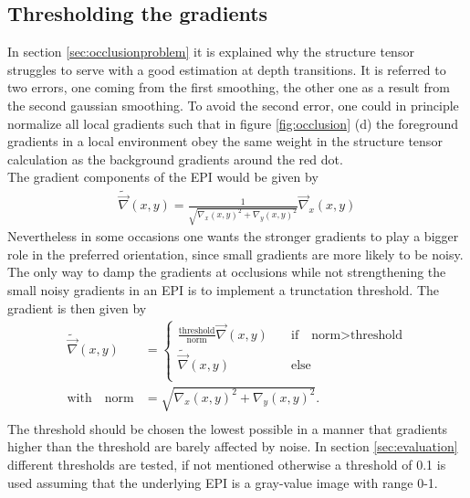 \documentclass  [
  paper    = a4,
  BCOR     = 10mm,
  twoside,
  fontsize = 12pt,
  fleqn,
  toc      = bibnumbered,
  toc      = listofnumbered,
  numbers  = noendperiod,
  headings = normal,
  listof   = leveldown,
  version  = 3.03
]                                       {scrreprt}
\begin{document}
 \subsection{Thresholding the gradients}
 \label{sec:thresholdinggradients}
 In section \ref{sec:occlusionproblem} it is explained why the structure tensor struggles to serve with a  good estimation at depth transitions. It is referred to two errors, one coming from the first smoothing, the other one as a result from the second gaussian smoothing. To avoid the second error, one could in principle normalize all local gradients such that in figure \ref{fig:occlusion} (d) the foreground gradients in a local environment obey the same weight in the structure tensor calculation as the background gradients around the red dot.\\
 The gradient components of the EPI would be given by
 \begin{align}
 	\tilde{\vec \nabla}(x,y) = \frac{1}{\sqrt{\nabla_x(x,y)^2 + \nabla_y(x,y)^2}} \vec \nabla_x(x,y)
 \end{align}
 Nevertheless in some occasions one wants the stronger gradients to play a bigger role in the preferred orientation, since small gradients are more likely to be noisy. The only way to damp the gradients at occlusions while not strengthening the small noisy gradients in an EPI is to implement a trunctation threshold. The gradient is then given by
 \begin{align}
 \tilde{\vec \nabla}(x,y) &= \begin{cases}
\frac{\text{threshold}}{\text{norm}} \vec \nabla(x,y) \quad &\text{if}\quad \text{norm}> \text{threshold}\\
\tilde{\vec \nabla}(x,y)\qquad &\text{else}\\
 \end{cases} \\
\text{with} \quad \text{norm} &= \sqrt{\nabla_x(x,y)^2 + \nabla_y(x,y)^2}.\\
 \end{align}
 The threshold should be chosen the lowest possible in a manner that gradients higher than the threshold are barely affected by noise. In section \ref{sec:evaluation} different thresholds are tested, if not mentioned otherwise a threshold of 0.1 is used assuming that the underlying EPI is a gray-value image with range 0-1.\\
 
\end{document}
